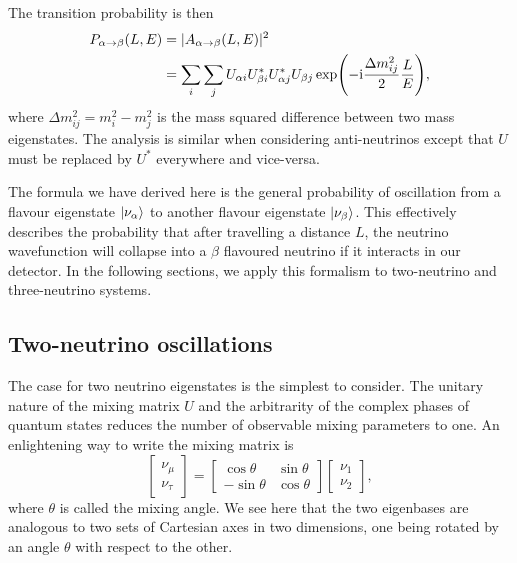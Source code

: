The transition probability is then
\begin{align}
	\label{eq:nuprob}
	P_{\alpha \rightarrow \beta}(L, E) &= |A_{\alpha \rightarrow \beta}(L, E)|^2 \nonumber\\
	&= \sum_i \sum_j U_{\alpha i} U^*_{\beta i} U^*_{\alpha j} U_{\beta j}
	\exp(-\mathrm{i} \frac{\Delta m_{ij}^2}{2} \frac{L}{E}),
\end{align}
where $\Delta m^2_{ij} = m^2_i - m^2_j$ is the mass squared difference between
two mass eigenstates.
The analysis is similar when considering anti-neutrinos except that $U$ must be
replaced by $U^*$ everywhere and vice-versa.

The formula we have derived here is the general probability of oscillation from a
flavour eigenstate $\ket{\nu_\alpha}$ to another flavour eigenstate
$\ket{\nu_\beta}$. This effectively describes the probability that after
travelling a distance $L$, the neutrino wavefunction will collapse into a
$\beta$ flavoured neutrino if it interacts in our detector.
In the following sections, we apply this formalism to two-neutrino and
three-neutrino systems. 



\subsection{Two-neutrino oscillations}\label{sec:twonu}
The case for two neutrino eigenstates is the simplest to consider. The
unitary nature of the mixing matrix $U$ and the arbitrarity of the complex phases
of quantum states reduces the number of observable mixing parameters to
one\cite{langacker}.
An enlightening way to write the mixing matrix is\cite{zuber} 
\begin{equation}
	\begin{bmatrix} \nu_\mu \\ \nu_\tau \end{bmatrix} =
	\begin{bmatrix} \cos\theta & \sin\theta \\
								 -\sin\theta & \cos\theta \end{bmatrix}
	\begin{bmatrix} \nu_1 \\ \nu_2 \end{bmatrix},
		\label{eq:twonumixing}
\end{equation}
where $\theta$ is called the mixing angle.
We see here that the two eigenbases are analogous to two sets of Cartesian axes
in two dimensions, one being rotated by an angle $\theta$ with respect to the
other.

